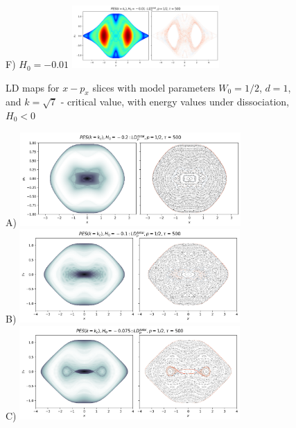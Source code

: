 \documentclass[10pt,aps,onecolumn,superscriptaddress]{revtex4-2}
\begin{document}
\begin{figure}
    F) $H_0 = -0.01$ \includegraphics[width=0.5\textwidth]{notebooks/bifurcation/k_critical/LD_total_x-px_tau_500_k_kc_E_-0.01.png}
    \caption{LD maps for $x-p_x$ slices with model parameters $W_0 = 1/2$, $d = 1$, and $k = \sqrt{7}$ - critical value, with energy values under dissociation, $H_0 < 0$}
\end{figure}

\newpage

\begin{figure}
    \centering
    A) \includegraphics[width=0.75\textwidth]{notebooks/bifurcation/k_critical/LD_total_y-py_tau_500_k_kc_E_-0.2_PP.png}\\
    B) \includegraphics[width=0.75\textwidth]{notebooks/bifurcation/k_critical/LD_total_y-py_tau_500_k_kc_E_-0.1_PP.png}\\
    C) \includegraphics[width=0.75\textwidth]{notebooks/bifurcation/k_critical/LD_total_x-px_tau_500_k_kc_E_-0.075_PP.png}\\

\end{figure}
\end{document}
